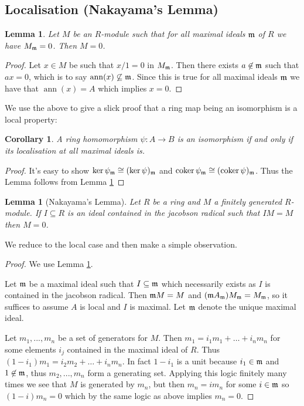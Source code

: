 \documentclass[12pt]{article}
\theoremstyle{plain}
\newtheorem{lemma}[thm]{Lemma}
\newtheorem{cor}[thm]{Corollary}
\theoremstyle{definition}
\newcommand{\lto}{\longrightarrow}
\begin{document}
\subsection{Localisation (Nakayama's Lemma)}
\begin{lemma}
\label{lem:localistation_zero}
Let $M$ be an $R$-module such that for all maximal ideals $\frak{m}$ of $R$ we have $M_\frak{m} = 0$. Then $M = 0$.
\end{lemma}
\begin{proof}
Let $x \in M$ be such that $x/1 = 0$ in $M_\frak{m}$. Then there exists $a \not\in \frak{m}$ such that $ax = 0$, which is to say $\operatorname{ann}(x) \not\subseteq \frak{m}$. Since this is true for all maximal ideals $\frak{m}$ we have that $\operatorname{ann}(x) = A$ which implies $x = 0$.
\end{proof}
We use the above to give a slick proof that a ring map being an isomorphism is a local property:
\begin{cor}
\label{cor:isomorphism_is_local}
A ring homomorphism $\psi: A \lto B$ is an isomorphism if and only if its localisation at all maximal ideals is.
\end{cor}
\begin{proof}
It's easy to show $\ker \psi_{\frak{m}} \cong (\ker \psi)_{\frak{m}}$ and $\operatorname{coker} \psi_{\frak{m}} \cong (\operatorname{coker} \psi)_{\frak{m}}$. Thus the Lemma follows from Lemma \ref{lem:localistation_zero}
\end{proof}
\begin{lemma}[Nakayama's Lemma]
Let $R$ be a ring and $M$ a finitely generated $R$-module. If $I \subseteq R$ is an ideal contained in the jacobson radical such that $IM = M$ then $M = 0$.
\end{lemma}
We reduce to the local case and then make a simple observation.
\begin{proof}
We use Lemma \ref{lem:localistation_zero}.

Let $\frak{m}$ be a maximal ideal such that $I \subseteq \frak{m}$ which necessarily exists as $I$ is contained in the jacobson radical. Then $\frak{m}M = M$ and $(\frak{m}A_{\frak{m}})M_{\frak{m}} = M_{\frak{m}}$, so it suffices to assume $A$ is local and $I$ is maximal. Let $\frak{m}$ denote the unique maximal ideal.

Let $m_1,..., m_n$ be a set of generators for $M$. Then $m_1 = i_1m_1 + \hdots + i_nm_n$ for some elements $i_j$ contained in the maximal ideal of $R$. Thus $(1-i_1)m_1 = i_2m_2 + \hdots + i_nm_n$. In fact $1 - i_1$ is a unit because $i_1 \in \frak{m}$ and $1 \not\in \frak{m}$, thus $m_2,...,m_n$ form a generating set. Applying this logic finitely many times we see that $M$ is generated by $m_n$, but then $m_n = im_n$ for some $i \in \frak{m}$ so $(1 - i)m_n = 0$ which by the same logic as above implies $m_n = 0$.
\end{proof}
\end{document}
